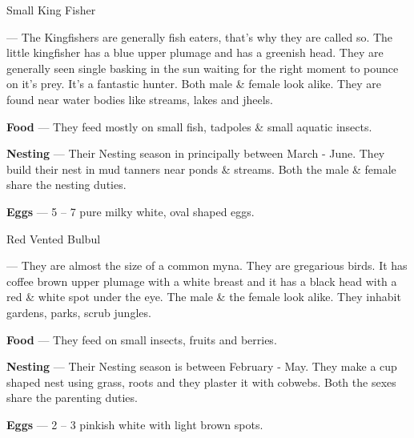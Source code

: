 \begin{bird}{Small King Fisher}

 --- The Kingfishers are generally fish eaters, that's why they are called so. The little kingfisher has a blue upper plumage and has a greenish head. They are generally seen single basking in the sun waiting for the right moment to pounce on it's prey. It's a fantastic hunter. Both male \& female look alike. They are found near water bodies like streams, lakes and jheels.

{\large\bf Food} --- They feed mostly on small fish, tadpoles \& small aquatic insects.

{\large\bf Nesting} --- Their Nesting season in principally between March - June. They build their nest in mud tanners near ponds \& streams. Both the male \& female share the nesting duties.

{\large\bf Eggs} --- 5 -- 7 pure milky white, oval shaped eggs.
\end{bird}

\begin{bird}{Red Vented Bulbul}

 --- They are almost the size of a common myna. They are gregarious birds. It has coffee brown upper plumage with a white breast and it has a black head with a red \& white spot under the eye. The male \& the female look alike. They inhabit gardens, parks, scrub jungles.

{\large\bf Food} --- They feed on small insects, fruits and berries.

{\large\bf Nesting} --- Their Nesting season is between February - May. They make a cup shaped nest using grass, roots and they plaster it with cobwebs. Both the sexes share the parenting duties.

{\large\bf Eggs} --- 2 -- 3 pinkish white with light brown spots.
\end{bird}

